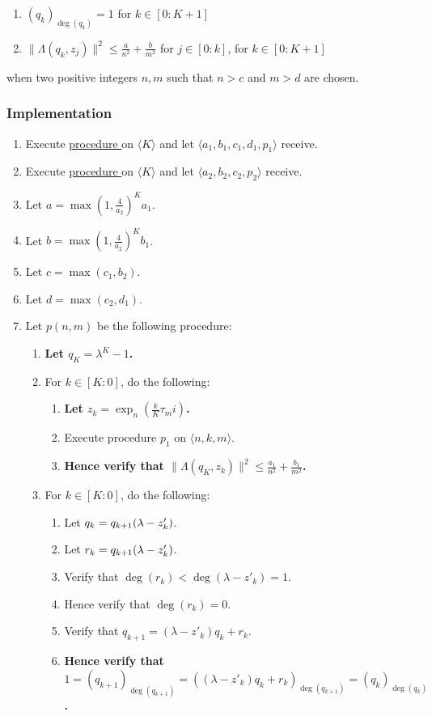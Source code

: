 \documentclass{article}
\let\div\relax\DeclareMathOperator{\div}{div}
\let\mod\relax\DeclareMathOperator{\mod}{mod}
\newcounter{procedure}[part]
\newcommand{\implementation}{\subsubsection*{Implementation}}
\newcommand{\procedurehr}[1]{\hyperref[sec:procedure #1]{procedure \expandafter\csname procedure#1\endcsname}}
\begin{document}
\begin{multicols}{2}
\begin{enumerate}
					\item $(q_k)_{\deg(q_k)}=1$ for $k\in[0:K+1]$
					\item $\lVert\Lambda(q_k,z_j)\rVert^2\le\frac{a}{n^2}+\frac{b}{m^2}$ for $j\in[0:k]$, for $k\in[0:K+1]$
				\end{enumerate}
				when two positive integers $n,m$ such that $n>c$ and $m>d$ are chosen.
			\implementation
				\begin{enumerate}
					\item Execute \procedurehr{3.59} on $\langle K\rangle$ and let $\langle a_1,b_1,c_1,d_1,p_1\rangle$ receive.
					\item Execute \procedurehr{3.63} on $\langle K\rangle$ and let $\langle a_2,b_2,c_2,p_2\rangle$ receive.
					\item Let $a=\max(1,\frac{4}{a_2})^Ka_1$.
					\item Let $b=\max(1,\frac{4}{a_2})^Kb_1$.
					\item Let $c=\max(c_1,b_2)$.
					\item Let $d=\max(c_2,d_1)$.
					\item Let $p(n,m)$ be the following procedure:
					\begin{enumerate}
						\item \textbf{Let $q_K=\lambda^K-1$.}
						\item For $k\in[K:0]$, do the following:
						\begin{enumerate}
							\item \textbf{Let $z_k=\exp_n(\frac{k}{K}\tau_mi)$.}
							\item Execute procedure $p_1$ on $\langle n,k,m\rangle$.
							\item \textbf{Hence verify that $\lVert\Lambda(q_K,z_k)\rVert^2\le\frac{a_1}{n^2}+\frac{b_1}{m^2}$.}
						\end{enumerate}
						\item For $k\in[K:0]$, do the following:
						\begin{enumerate}
							\item Let $q_k=q_{k+1}\div(\lambda-z'_k)$.
							\item Let $r_k=q_{k+1}\mod(\lambda-z'_k)$.
							\item Verify that $\deg(r_k)<\deg(\lambda-z'_k)=1$.
							\item Hence verify that $\deg(r_k)=0$.
							\item Verify that $q_{k+1}=(\lambda-z'_k)q_k+r_k$.
							\item \textbf{Hence verify that $1=(q_{k+1})_{\deg(q_{k+1})}=((\lambda-z'_k)q_k+r_k)_{\deg(q_{k+1})}=(q_k)_{\deg(q_k)}$.}

\end{enumerate}
\end{enumerate}
\end{enumerate}
\end{multicols}
\end{document}
